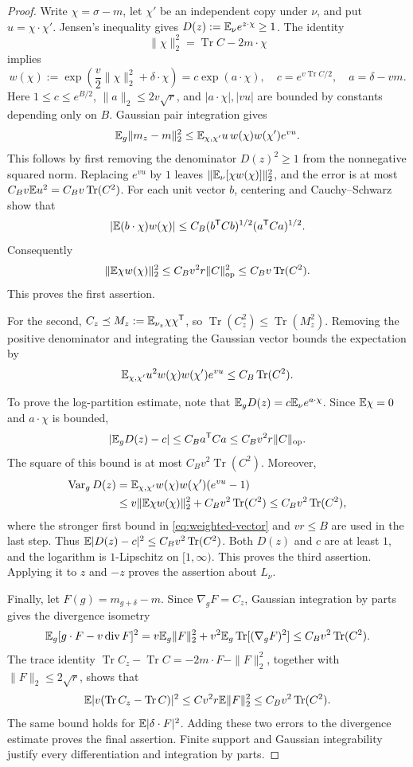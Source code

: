 \documentclass[11pt,reqno]{amsart}
\newcommand{\Var}{\operatorname{Var}}
\newcommand{\Tr}{\operatorname{Tr}}
\newcommand{\op}{\operatorname{op}}
\begin{document}
\begin{proof}
Write $\chi=\sigma-m$, let $\chi'$ be an independent copy under $\nu$,
and put $u=\chi\cdot\chi'$. Jensen's inequality gives
$D(z):={\mathbb{E}}_\nu e^{z\cdot\chi}\ge1$. The identity
\[
 \|\chi\|_2^2=\Tr C-2m\cdot\chi
\]
implies
\[
 w(\chi):=\exp\left(\frac v2\|\chi\|_2^2+\delta\cdot\chi\right)
   =c\exp(a\cdot\chi),\quad
 c=e^{v\Tr C/2},\quad a=\delta-vm.
\]
Here $1\le c\le e^{B/2}$, $\|a\|_2\le2v\sqrt r$, and
$|a\cdot\chi|,|vu|$ are bounded by constants depending only on $B$.
Gaussian pair integration gives
\[
 {\mathbb{E}}_g\|m_z-m\|_2^2
 \le {\mathbb{E}}_{\chi,\chi'}u\,w(\chi)w(\chi')e^{vu}.
\]
This follows by first removing the denominator $D(z)^2\ge1$ from the
nonnegative squared norm. Replacing $e^{vu}$ by $1$ leaves
$\|{\mathbb{E}}_\nu[\chi w(\chi)]\|_2^2$, and the error is at most
$C_Bv\bbE u^2=C_Bv\Tr(C^2)$.
For each unit vector $b$, centering and Cauchy--Schwarz show that
\[
 |{\mathbb{E}}(b\cdot\chi)w(\chi)|
 \le C_B(b^{\mathsf T}Cb)^{1/2}(a^{\mathsf T}Ca)^{1/2}.
\]
Consequently
\begin{equation}\label{eq:weighted-vector}
 \|\bbE\chi w(\chi)\|_2^2
 \le C_Bv^2r\|C\|_{\op}^2
 \le C_Bv\Tr(C^2).
\end{equation}
This proves the first assertion.

For the second, $C_z\preceq M_z:={\mathbb{E}}_{\nu_z}\chi\chi^{\mathsf T}$, so
$\Tr(C_z^2)\le\Tr(M_z^2)$. Removing the positive denominator and
integrating the Gaussian vector bounds the expectation by
\[
 \bbE_{\chi,\chi'}u^2w(\chi)w(\chi')e^{vu}
 \le C_B\Tr(C^2).
\]

To prove the log-partition estimate, note that
${\mathbb{E}}_gD(z)=c{\mathbb{E}}_\nu e^{a\cdot\chi}$. Since ${\mathbb{E}}\chi=0$ and
$a\cdot\chi$ is bounded,
\[
 |\bbE_gD(z)-c|\le C_Ba^{\mathsf T}Ca
 \le C_Bv^2r\|C\|_{\op}.
\]
The square of this bound is at most $C_Bv^2\Tr(C^2)$.
Moreover,
\begin{align*}
 \Var_g D(z)
 &=\bbE_{\chi,\chi'}w(\chi)w(\chi')(e^{vu}-1)\\
 &\le v\|\bbE\chi w(\chi)\|_2^2+C_Bv^2\Tr(C^2)
 \le C_Bv^2\Tr(C^2),
\end{align*}
where the stronger first bound in \eqref{eq:weighted-vector} and $vr\le B$
are used in the last step. Thus $\bbE|D(z)-c|^2\le C_Bv^2\Tr(C^2)$.
Both $D(z)$ and $c$ are at least $1$, and the logarithm is
$1$-Lipschitz on $[1,\infty)$. This proves the third assertion. Applying
it to $z$ and $-z$ proves the assertion about $L_\nu$.

Finally, let $F(g)=m_{g+\delta}-m$. Since $\nabla_gF=C_z$, Gaussian
integration by parts gives the divergence isometry
\[
 \bbE_g[g\cdot F-v\operatorname{div}F]^2
 =v\bbE_g\|F\|_2^2+v^2\bbE_g\Tr[(\nabla_gF)^2]
 \le C_Bv^2\Tr(C^2).
\]
The trace identity
$\Tr C_z-\Tr C=-2m\cdot F-\|F\|_2^2$, together with
$\|F\|_2\le2\sqrt r$, shows that
\[
 \bbE|v(\Tr C_z-\Tr C)|^2
   \le C v^2r\bbE\|F\|_2^2\le C_Bv^2\Tr(C^2).
\]
The same bound holds for ${\mathbb{E}}|\delta\cdot F|^2$.
Adding these two errors to the divergence estimate proves the final
assertion. Finite support and Gaussian integrability justify every
differentiation and integration by parts.
\end{proof}
\end{document}
